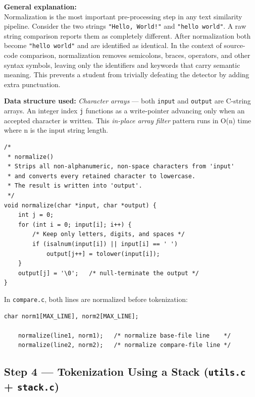 \documentclass[12pt,a4paper]{article}
\begin{document}
\smallskip
\textbf{General explanation:}\\
Normalization is the most important pre-processing step in any text similarity pipeline. Consider the two strings \texttt{"Hello, World!"} and \texttt{"hello world"}. A raw string comparison reports them as completely different. After normalization both become \texttt{"hello world"} and are identified as identical. In the context of source-code comparison, normalization removes semicolons, braces, operators, and other syntax symbols, leaving only the identifiers and keywords that carry semantic meaning. This prevents a student from trivially defeating the detector by adding extra punctuation.

\smallskip
\textbf{Data structure used:} \textit{Character arrays} — both \texttt{input} and \texttt{output} are C-string arrays. An integer index \texttt{j} functions as a write-pointer advancing only when an accepted character is written. This \textit{in-place array filter} pattern runs in O(n) time where n is the input string length.

\begin{lstlisting}[caption={\texttt{utils.c} -- \texttt{normalize}: discard punctuation, convert to lowercase}]
/*
 * normalize()
 * Strips all non-alphanumeric, non-space characters from 'input'
 * and converts every retained character to lowercase.
 * The result is written into 'output'.
 */
void normalize(char *input, char *output) {
    int j = 0;
    for (int i = 0; input[i]; i++) {
        /* Keep only letters, digits, and spaces */
        if (isalnum(input[i]) || input[i] == ' ')
            output[j++] = tolower(input[i]);
    }
    output[j] = '\0';   /* null-terminate the output */
}
\end{lstlisting}

In \texttt{compare.c}, both lines are normalized before tokenization:

\begin{lstlisting}[caption={\texttt{compare.c} -- Calling normalize on both lines inside the loop}]
    char norm1[MAX_LINE], norm2[MAX_LINE];

    normalize(line1, norm1);   /* normalize base-file line    */
    normalize(line2, norm2);   /* normalize compare-file line */
\end{lstlisting}

\subsection{Step 4 — Tokenization Using a Stack (\texttt{utils.c} + \texttt{stack.c})}
\end{document}
